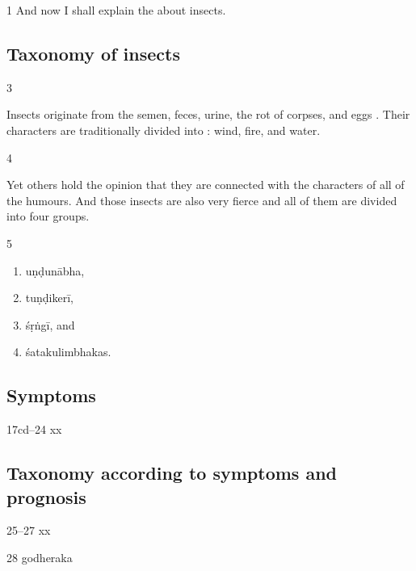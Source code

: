 \begin{translation}

\item[1]
 And now I shall explain the  about 
 insects.
 
 


\subsection{Taxonomy of insects}


\item [3] 

Insects originate from the semen, feces, urine, the rot of corpses,
and eggs .  Their
characters are traditionally divided
into : wind, fire, and water.

\item[4]

Yet others hold the opinion that they are connected with the
characters of all of the humours. And those
insects are also very fierce and all of them are divided into four
groups.

\item[5]
\begin{enumerate}
    \item \Gls{uṇḍunābha},
    \item \gls{tuṇḍikerī},
    \item \gls{śṛṅgī}, and
    \item \glspl{śatakulimbhaka}.    
\end{enumerate}

\subsection{Symptoms}

\item[17cd--24] xx

\subsection{Taxonomy according to symptoms and prognosis}

\item[25--27] xx

\item [28]  \gls{godheraka}    \label{godheraka}
    

\end{translation}
